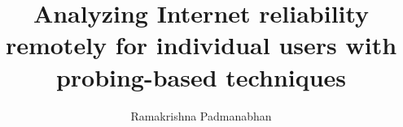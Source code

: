 

\newcommand{\planetlab}{PlanetLab\xspace}


\title{Analyzing Internet reliability remotely for
  individual users with probing-based techniques}

\author{Ramakrishna Padmanabhan}



\newcommand{\bb}{~~~~~}
\newcommand{\hdr}[1]{\multicolumn{1}{c}{\textbf{#1}}}
\newcommand\Tstrut{\rule{0pt}{2.2ex}}         %
\newcommand\Bstrut{\rule[-0.9ex]{0pt}{0pt}}   %

\maketitle


\newpage















\label{cpt:weather}








\clearpage %





